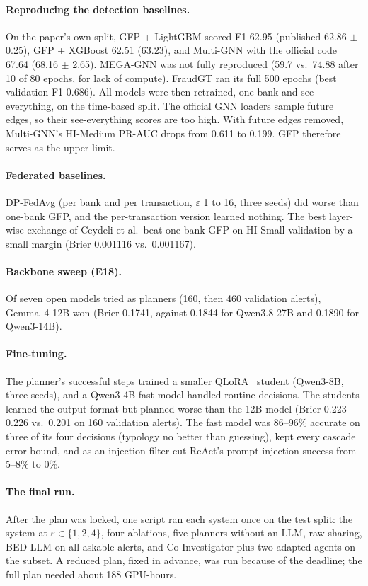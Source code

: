\documentclass[11pt,a4paper]{article}
\newcommand{\eps}{\varepsilon}
\begin{document}
\paragraph{Reproducing the detection baselines.} On the paper's own split, GFP + LightGBM scored F1 62.95 (published 62.86 $\pm$ 0.25), GFP + XGBoost 62.51 (63.23), and Multi-GNN with the official code 67.64 (68.16 $\pm$ 2.65). MEGA-GNN was not fully reproduced (59.7 vs.\ 74.88 after 10 of 80 epochs, for lack of compute). FraudGT ran its full 500 epochs (best validation F1 0.686). All models were then retrained, one bank and see everything, on the time-based split. The official GNN loaders sample future edges, so their see-everything scores are too high. With future edges removed, Multi-GNN's HI-Medium PR-AUC drops from 0.611 to 0.199. GFP therefore serves as the upper limit.

\paragraph{Federated baselines.} DP-FedAvg (per bank and per transaction, $\eps$ 1 to 16, three seeds) did worse than one-bank GFP, and the per-transaction version learned nothing. The best layer-wise exchange of Ceydeli et al.\ beat one-bank GFP on HI-Small validation by a small margin (Brier 0.001116 vs.\ 0.001167).

\paragraph{Backbone sweep (E18).} Of seven open models tried as planners (160, then 460 validation alerts), Gemma~4 12B won (Brier 0.1741, against 0.1844 for Qwen3.8-27B and 0.1890 for Qwen3-14B).

\paragraph{Fine-tuning.} The planner's successful steps trained a smaller QLoRA~\cite{hu2022lora,dettmers2023} student (Qwen3-8B, three seeds), and a Qwen3-4B fast model handled routine decisions. The students learned the output format but planned worse than the 12B model (Brier 0.223--0.226 vs.\ 0.201 on 160 validation alerts). The fast model was 86--96\% accurate on three of its four decisions (typology no better than guessing), kept every cascade error bound, and as an injection filter cut ReAct's prompt-injection success from 5--8\% to 0\%.

\paragraph{The final run.} After the plan was locked, one script ran each system once on the test split: the system at $\eps\in\{1,2,4\}$, four ablations, five planners without an LLM, raw sharing, BED-LLM on all askable alerts, and Co-Investigator plus two adapted agents on the subset. A reduced plan, fixed in advance, was run because of the deadline; the full plan needed about 188 GPU-hours.
\end{document}
